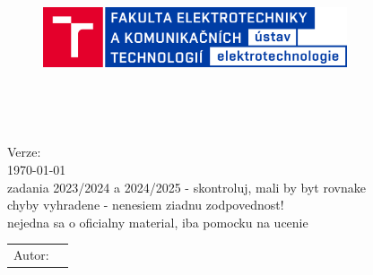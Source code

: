
\begin{titlepage}

	\begin{center}
		\vspace{-1.5cm}
		
		\begin{figure}[!h]
			\centering
			\includegraphics[width=0.8\textwidth]{images/UETE_Color_RGB_CZ.png}
		\end{figure}
		
		\vspace{4cm}
	
		\LARGE{\textbf{\predmet}}\\
		\vspace{1cm}

		\textbf{\dokument}\\
		\vspace{0.5cm}

		\large{Verze: \verze} \\
		
		\color{red}
		\today \\
		zadania 2023/2024 a 2024/2025 - skontroluj, mali by byt rovnake \\
		chyby vyhradene - nenesiem ziadnu zodpovednost! \\
		nejedna sa o oficialny material, iba pomocku na ucenie
		\color{black}
		
		\vfill

		\Large\begin{tabular}{ll}
			Autor:      & \autor     \\
		\end{tabular}
		\hfill
	\end{center}
\end{titlepage}